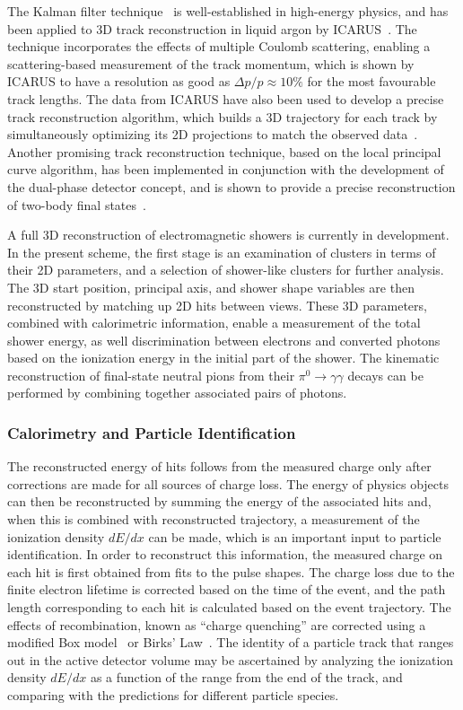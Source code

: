 The Kalman filter technique~\cite{kalman} is well-established in high-energy physics,
and has been applied to 3D track reconstruction in liquid argon by ICARUS~\cite{Ankowski:2006ts}.
The technique incorporates the effects of multiple Coulomb scattering,
enabling a scattering-based measurement of the track momentum,
which is shown by ICARUS to have a resolution as good as $\Delta p/p \approx 10\%$ 
for the most favourable track lengths.
The data from ICARUS have also been used to develop a precise
track reconstruction algorithm, which builds a 3D trajectory for each track by simultaneously
optimizing its 2D projections to match the observed data~\cite{Antonello:2012hu}.
Another promising track reconstruction technique, based on the local principal curve algorithm,
has been implemented in conjunction with the development of the 
dual-phase detector concept, and is shown to provide 
a precise reconstruction of two-body final states~\cite{Back:2013cva,LAGUNA-LBNO-deliv}. 

A full 3D reconstruction of electromagnetic showers is currently in development.
In the present scheme, the first stage is an examination of clusters 
in terms of their 2D parameters, and a selection of shower-like clusters 
for further analysis. The 3D start position, principal axis,
and shower shape variables are then reconstructed by matching up 2D hits between views.
These 3D parameters, combined with calorimetric information, enable a measurement
of the total shower energy, as well discrimination between electrons
and converted photons based on the ionization energy in the initial part of
the shower. The kinematic reconstruction of final-state neutral pions from their
$\pi^{0} \rightarrow \gamma\gamma$ decays can be performed by 
combining together associated pairs of photons.


\subsubsection{Calorimetry and Particle Identification}

The reconstructed energy of hits follows from the measured charge 
only after corrections are made for all sources of charge loss. 
The energy of physics objects can then be reconstructed by summing 
the energy of the associated hits and, when this is combined with 
reconstructed trajectory, a measurement of the
ionization density $dE/dx$ can be made, which is an important input 
to particle identification.
In order to reconstruct this information, the measured charge on each hit 
is first obtained from fits to the pulse shapes.
The charge loss due to the finite electron lifetime is corrected
based on the time of the event, and the path length corresponding
to each hit is calculated based on the event trajectory.
The effects of recombination, known as ``charge quenching''
are corrected using a modified Box model~\cite{Thomas:1987zz} 
or Birks' Law~\cite{Birks:1964zz}.
The identity of a particle track that ranges out in the active detector volume
may be ascertained by analyzing the ionization density $dE/dx$ as a function of 
the range from the end of the track, and comparing with the predictions
for different particle species. 
 
